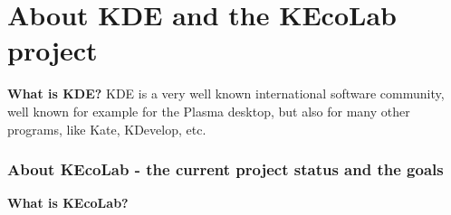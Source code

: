 \chapter{About KDE and the KEcoLab project}
\textbf{What is KDE?}
\newline
KDE is a very well known international software community, well known for 
example for the Plasma desktop, but also for many other programs, like Kate, 
KDevelop, etc.

\subsection{About KEcoLab - the current project status and the goals}
\textbf{What is KEcoLab?}